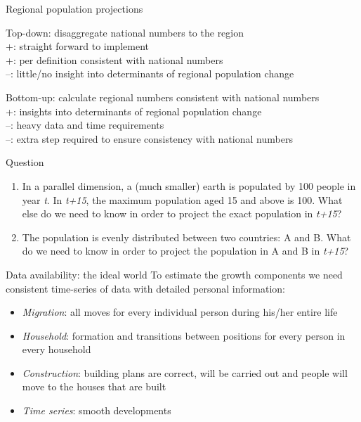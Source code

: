 \documentclass[final, 12pt, aspectratio=169, xcolor={dvipsnames}]{beamer}
\begin{document}
\begin{frame}{Regional population projections}
  \begin{minipage}[t]{0.48\linewidth}%
    Top-down: disaggregate national numbers to the region \\
    +: straight forward to implement \\
    +: per definition consistent with national numbers \\
    --: little/no insight into determinants of regional population change
 
\end{minipage}%
\hfill%
\begin{minipage}[t]{0.48\linewidth}
  Bottom-up: calculate regional numbers consistent with national numbers \\

  +: insights into determinants of regional population change \\
  --: heavy data and time requirements \\
  --: extra step required to ensure consistency with national numbers \\
\end{minipage}    
\end{frame}

\begin{frame}{Question}
  \begin{enumerate}
  \item In a parallel dimension, a (much smaller) earth is populated by 100 people in year \textit{t}. In \textit{t+15}, the maximum population aged 15 and above is 100. What else do we need to know in order to project the exact population in \textit{t+15}?
  \item The population is evenly distributed between two countries: A and B. What do we need to know in order to project the population in A and B in \textit{t+15}?
    \end{enumerate}
  \end{frame}

\begin{frame}{Data availability: the ideal world}
To estimate the growth components we need consistent time-series of data with detailed personal information:  
  \begin{itemize}
  \item \textit{Migration}: all moves for every individual person during his/her entire life
  \item \textit{Household}: formation and transitions between positions for every person in every household
  \item \textit{Construction}: building plans are correct, will be carried out and people will move to the houses that are built
    \item \textit{Time series}: smooth developments
    \end{itemize}
  \end{frame}
\end{document}
